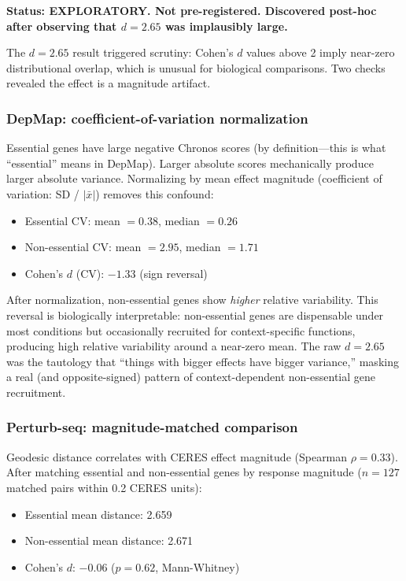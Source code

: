 \documentclass[11pt]{article}
\begin{document}
\textbf{Status: EXPLORATORY. Not pre-registered. Discovered post-hoc
after observing that $d = 2.65$ was implausibly large.}

The $d = 2.65$ result triggered scrutiny: Cohen's $d$ values above 2
imply near-zero distributional overlap, which is unusual for biological
comparisons. Two checks revealed the effect is a magnitude artifact.

\subsubsection{DepMap: coefficient-of-variation normalization}

Essential genes have large negative Chronos scores (by definition---this
is what ``essential'' means in DepMap). Larger absolute scores
mechanically produce larger absolute variance. Normalizing by mean
effect magnitude (coefficient of variation: SD / $|\bar{x}|$) removes
this confound:

\begin{itemize}
  \item Essential CV: mean $= 0.38$, median $= 0.26$
  \item Non-essential CV: mean $= 2.95$, median $= 1.71$
  \item Cohen's $d$ (CV): $-1.33$ (sign reversal)
\end{itemize}

After normalization, non-essential genes show \emph{higher} relative
variability. This reversal is biologically interpretable: non-essential
genes are dispensable under most conditions but occasionally recruited
for context-specific functions, producing high relative variability
around a near-zero mean. The raw $d = 2.65$ was the tautology that
``things with bigger effects have bigger variance,'' masking a real (and
opposite-signed) pattern of context-dependent non-essential gene
recruitment.

\subsubsection{Perturb-seq: magnitude-matched comparison}

Geodesic distance correlates with CERES effect magnitude (Spearman $\rho
= 0.33$). After matching essential and non-essential
genes by response magnitude ($n = 127$ matched pairs within 0.2 CERES
units):

\begin{itemize}
  \item Essential mean distance: 2.659
  \item Non-essential mean distance: 2.671
  \item Cohen's $d$: $-0.06$ ($p = 0.62$, Mann-Whitney)
\end{itemize}
\end{document}

